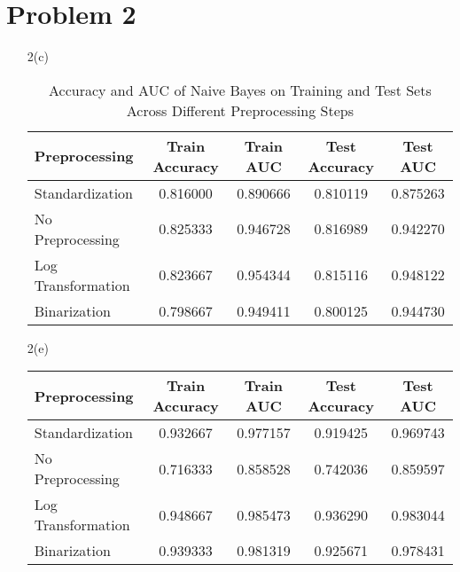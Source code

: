 \documentclass[10pt,letterpaper]{article}
\begin{document}
    \section{Problem 2}
        \begin{itemize}
            \item[2(c)]
                \begin{table}[H]
                    \centering
                    \begin{tabular}{lcccc}
                        \toprule
                        \textbf{Preprocessing} & \textbf{Train Accuracy} & \textbf{Train AUC} & \textbf{Test Accuracy} & \textbf{Test AUC} \\
                        \midrule
                        Standardization & 0.816000 & 0.890666 & 0.810119 & 0.875263 \\
                        No Preprocessing & 0.825333 & 0.946728 & 0.816989 & 0.942270 \\
                        Log Transformation & 0.823667 & 0.954344 & 0.815116 & 0.948122 \\
                        Binarization & 0.798667 & 0.949411 & 0.800125 & 0.944730 \\
                        \bottomrule
                    \end{tabular}
                    \caption{Accuracy and AUC of Naive Bayes on Training and Test Sets Across Different Preprocessing Steps}
                    \label{tab:nb_results}
                \end{table}
            \item[2(e)]
                \begin{table}[H]
                    \centering
                    \begin{tabular}{lcccc}
                        \toprule
                        \textbf{Preprocessing} & \textbf{Train Accuracy} & \textbf{Train AUC} & \textbf{Test Accuracy} & \textbf{Test AUC} \\
                        \midrule
                        Standardization & 0.932667 & 0.977157 & 0.919425 & 0.969743 \\
                        No Preprocessing & 0.716333 & 0.858528 & 0.742036 & 0.859597 \\
                        Log Transformation & 0.948667 & 0.985473 & 0.936290 & 0.983044 \\
                        Binarization & 0.939333 & 0.981319 & 0.925671 & 0.978431 \\

\end{tabular}
\end{table}
\end{itemize}
\end{document}
